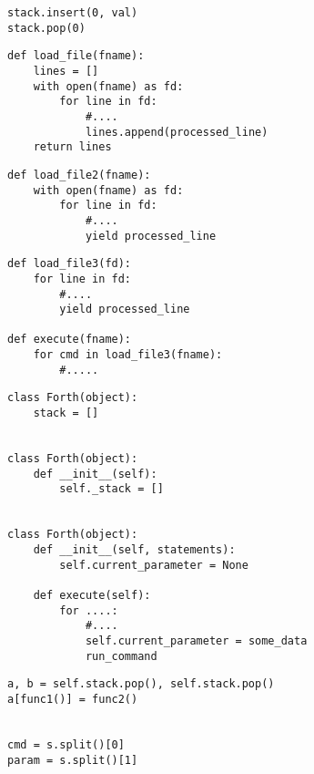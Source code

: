 \documentclass{article}
\begin{document}
\LARGE
\begin{lstlisting}
stack.insert(0, val)
stack.pop(0)
\end{lstlisting}
\newpage

\begin{lstlisting}
def load_file(fname):
    lines = []
    with open(fname) as fd:
        for line in fd:
            #....
            lines.append(processed_line)
    return lines
\end{lstlisting}
\newpage

\begin{lstlisting}
def load_file2(fname):
    with open(fname) as fd:
        for line in fd:
            #....
            yield processed_line

\end{lstlisting}
\newpage

\begin{lstlisting}
def load_file3(fd):
    for line in fd:
        #....
        yield processed_line

def execute(fname):
    for cmd in load_file3(fname):
        #.....
\end{lstlisting}
\newpage

\begin{lstlisting}
class Forth(object):
    stack = []


class Forth(object):
    def __init__(self):
        self._stack = []


class Forth(object):
    def __init__(self, statements):
        self.current_parameter = None

    def execute(self):
        for ....:
            #....
            self.current_parameter = some_data
            run_command
\end{lstlisting}
\newpage

\begin{lstlisting}
a, b = self.stack.pop(), self.stack.pop()
a[func1()] = func2()


cmd = s.split()[0]
param = s.split()[1]
\end{lstlisting}
\newpage
\end{document}
